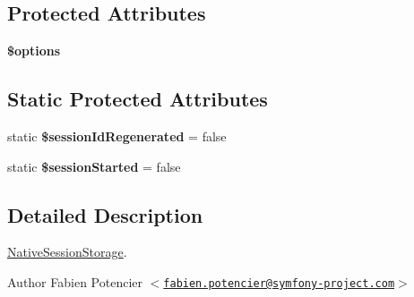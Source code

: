 \subsection*{\-Protected \-Attributes}
\begin{DoxyCompactItemize}
\item 
\hypertarget{class_symfony_1_1_component_1_1_http_foundation_1_1_session_storage_1_1_native_session_storage_a011800c63ece4cbbfa77136a20607023}{
{\bfseries \$options}}
\label{class_symfony_1_1_component_1_1_http_foundation_1_1_session_storage_1_1_native_session_storage_a011800c63ece4cbbfa77136a20607023}

\end{DoxyCompactItemize}
\subsection*{\-Static \-Protected \-Attributes}
\begin{DoxyCompactItemize}
\item 
\hypertarget{class_symfony_1_1_component_1_1_http_foundation_1_1_session_storage_1_1_native_session_storage_af518c5ca1dcb27f204c13161dfbf1fa5}{
static {\bfseries \$session\-Id\-Regenerated} = false}
\label{class_symfony_1_1_component_1_1_http_foundation_1_1_session_storage_1_1_native_session_storage_af518c5ca1dcb27f204c13161dfbf1fa5}

\item 
\hypertarget{class_symfony_1_1_component_1_1_http_foundation_1_1_session_storage_1_1_native_session_storage_a3df751dc55b26fd3a27a5da24e085c35}{
static {\bfseries \$session\-Started} = false}
\label{class_symfony_1_1_component_1_1_http_foundation_1_1_session_storage_1_1_native_session_storage_a3df751dc55b26fd3a27a5da24e085c35}

\end{DoxyCompactItemize}


\subsection{\-Detailed \-Description}
\hyperlink{class_symfony_1_1_component_1_1_http_foundation_1_1_session_storage_1_1_native_session_storage}{\-Native\-Session\-Storage}.

\begin{DoxyAuthor}{\-Author}
\-Fabien \-Potencier $<$\href{mailto:fabien.potencier@symfony-project.com}{\tt fabien.\-potencier@symfony-\/project.\-com}$>$ 
\end{DoxyAuthor}


